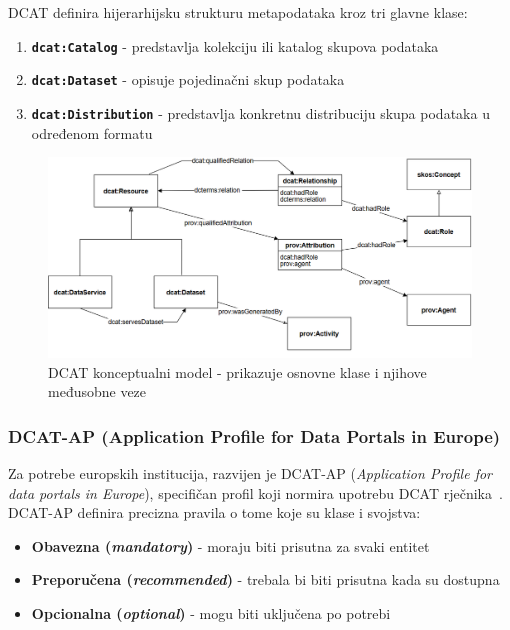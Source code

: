 DCAT definira hijerarhijsku strukturu metapodataka kroz tri glavne klase:

\begin{enumerate}
    \item \textbf{\texttt{dcat:Catalog}} - predstavlja kolekciju ili katalog skupova podataka
    \item \textbf{\texttt{dcat:Dataset}} - opisuje pojedinačni skup podataka
    \item \textbf{\texttt{dcat:Distribution}} - predstavlja konkretnu distribuciju skupa podataka u određenom formatu
\end{enumerate}

\begin{figure}[htbp]
    \centering
    \includegraphics[width=1\textwidth]{figures/dcat.png}
    \caption{DCAT konceptualni model - prikazuje osnovne klase i njihove međusobne veze~\cite{dcat2020}}
    \label{fig:dcat_conceptual_model}
\end{figure}

\subsubsection{DCAT-AP (Application Profile for Data Portals in Europe)}

Za potrebe europskih institucija, razvijen je DCAT-AP (\textit{Application Profile for data portals in Europe}), specifičan profil koji normira upotrebu DCAT rječnika~\cite{dcatap2020}. DCAT-AP definira precizna pravila o tome koje su klase i svojstva:

\begin{itemize}
    \item \textbf{Obavezna (\textit{mandatory})} - moraju biti prisutna za svaki entitet
    \item \textbf{Preporučena (\textit{recommended})} - trebala bi biti prisutna kada su dostupna
    \item \textbf{Opcionalna (\textit{optional})} - mogu biti uključena po potrebi
\end{itemize}

